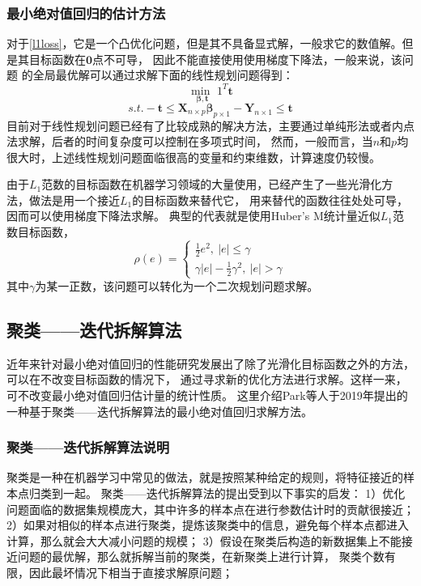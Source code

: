 \subsubsection{最小绝对值回归的估计方法}
对于\eqref{l1loss}，它是一个凸优化问题，但是其不具备显式解，一般求它的数值解。但是其目标函数在$\bm{0}$点不可导，
因此不能直接使用使用梯度下降法，一般来说，该问题
的全局最优解可以通过求解下面的线性规划问题得到：
$$
    \underset{\bm{\beta}, \bm{t}}{\operatorname{min\ }} 1^T \bm{t}
$$
$$
    s.t. -\bm{t} \leq \bm{X}_{n\times p}\bm{\beta}_{p\times1} - \bm{Y}_{n\times 1} \leq \bm{t}
$$
目前对于线性规划问题已经有了比较成熟的解决方法，主要通过单纯形法或者内点法求解，后者的时间复杂度可以控制在多项式时间，
然而，一般而言，当$n$和$p$均很大时，上述线性规划问题面临很高的变量和约束维数，计算速度仍较慢。

由于$L_1$范数的目标函数在机器学习领域的大量使用，已经产生了一些光滑化方法，做法是用一个接近$L_1$的目标函数来替代它，
用来替代的函数往往处处可导，因而可以使用梯度下降法求解。
典型的代表就是使用Huber’s M统计量近似$L_1$范数目标函数\cite{lucas1997robustness}，
\begin{equation*}
    \rho(e) = \left\{
        \begin{array}{clr}
            \frac1{2}e^2,\ |e| \leq \gamma \\
            \gamma |e| - \frac1{2}\gamma ^2 ,\ |e| > \gamma
        \end{array}
    \right.
\end{equation*}
其中$\gamma$为某一正数，该问题可以转化为一个二次规划问题求解。

\subsection{聚类——迭代拆解算法}
近年来针对最小绝对值回归的性能研究发展出了除了光滑化目标函数之外的方法，可以在不改变目标函数的情况下，
通过寻求新的优化方法进行求解。这样一来，可不改变最小绝对值回归估计量的统计性质。
这里介绍Park等人于2019年提出的一种基于聚类——迭代拆解算法的最小绝对值回归求解方法\cite{park2021optimization}。

\subsubsection{聚类——迭代拆解算法说明}
聚类是一种在机器学习中常见的做法，就是按照某种给定的规则，将特征接近的样本点归类到一起。
聚类——迭代拆解算法的提出受到以下事实的启发：
1）优化问题面临的数据集规模庞大，其中许多的样本点在进行参数估计时的贡献很接近；
2）如果对相似的样本点进行聚类，提炼该聚类中的信息，避免每个样本点都进入计算，那么就会大大减小问题的规模；
3）假设在聚类后构造的新数据集上不能接近问题的最优解，那么就拆解当前的聚类，在新聚类上进行计算，
聚类个数有限，因此最坏情况下相当于直接求解原问题；

